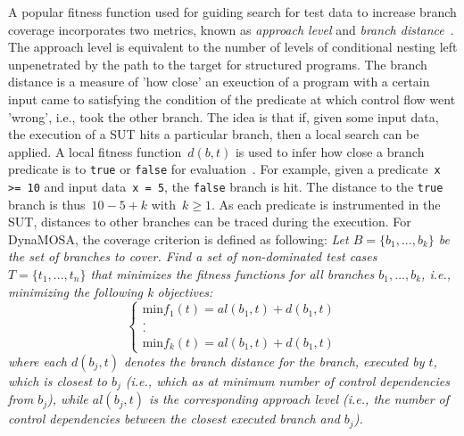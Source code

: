 \documentclass{article}
\begin{document}
A popular fitness function used for guiding search for test data to increase branch coverage incorporates two metrics, known as \textit{approach level} and \textit{branch distance}~\cite{Wegener2001}. The approach level is equivalent to the number of levels of conditional nesting left unpenetrated by the path to the target for structured programs. The branch distance is a measure of 'how close' an exeuction of a program with a certain input came to satisfying the condition of the predicate at which control flow went 'wrong', i.e., took the other branch. The idea is that if, given some input data, the execution of a \ac{SUT} hits a particular branch, then a local search can be applied. A local fitness function~$d(b, t)$ is used to infer how close a branch predicate is to \lstinline{true} or \lstinline{false} for evaluation~\cite{McMinn_2004}. For example, given a predicate~\lstinline{x >= 10} and input data~\lstinline{x = 5}, the \lstinline{false} branch is hit. The distance to the \lstinline{true} branch is thus~$10 - 5 + k$ with~$k \geq 1$. As each predicate is instrumented in the \ac{SUT}, distances to other branches can be traced during the execution. For \ac{DynaMOSA}, the coverage criterion is defined as following: \textit{Let $B = \{b_1, ..., b_k\}$ be the set of branches to cover. Find a set of non-dominated test cases $T = \{t_1,...,t_n\}$ that minimizes the fitness functions for all branches $b_1, ..., b_k$, i.e., minimizing the following k objectives:}
\[
     \left\{\begin{array}{l}
         \text{min}f_1(t) = al(b_1,t) + d(b_1,t)\\
         . \\
         . \\
         \text{min}f_k(t) = al(b_1,t) + d(b_1,t)
        \end{array}
    \right.
  \]
\textit{where each $d(b_j, t)$ denotes the branch distance for the branch, executed by $t$, which is closest to $b_j$ (i.e., which as at minimum number of control dependencies from $b_j$), while $al(b_j,t)$ is the corresponding approach level (i.e., the number of control dependencies between the closest executed branch and $b_j$).}
\end{document}
